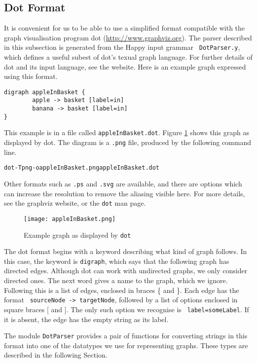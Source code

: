\documentclass[a4paper]{article}
\begin{document}
\subsection{Dot Format}
\label{dotFormat}
It is convenient for us to be able to use a simplified format
compatible with the graph visualisation program dot
(\url{http://www.graphviz.org}).  The parser described in this
subsection is generated from the Happy input grammar {\tt
  DotParser.y}, which defines a useful subest of dot's texual graph
language. For further details of dot and its input language, see the
website.  Here is an example graph expressed using this format.  


\begin{verbatim}
digraph appleInBasket {
        apple -> basket [label=in]
        banana -> basket [label=in]
}
\end{verbatim}
This example is in a file called {\tt appleInBasket.dot}.  Figure
\ref{appleInBasket} shows this graph as displayed by dot.  The diagram
is a {\tt .png} file, produced by the following command line.
\begin{alltt}
dot -Tpng -o appleInBasket.png appleInBasket.dot
\end{alltt}
Other formats such as {\tt .ps} and {\tt .svg} are available, and
there are options which can increase the resolution to remove the
aliasing visible here.  For more details, see the graphviz website, or
the {\tt dot} man page.

\begin{figure}
\begin{center}
\texttt{[image: appleInBasket.png]}
\end{center}
\caption{Example graph as displayed by {\tt dot}}
\label{appleInBasket}
\end{figure}

The dot format begins with a keyword describing what kind of graph
follows.  In this case, the keyword is {\tt digraph}, which says that
the following graph has directed edges.  Although dot can work with
undirected graphs, we only consider directed ones.  The next word
gives a name to the graph, which we ignore.  Following this is a list
of edges, enclosed in braces \{ and \}.  Each edge has the format {\tt
  sourceNode -> targetNode}, followed by a list of options enclosed in
square braces [ and ].  The only such option we recognise is {\tt
  label=someLabel}.  If it is absent, the edge has the empty string as
its label.

The module {\tt DotParser} provides a pair of functions for converting
strings in this format into one of the datatypes we use for
representing graphs.  These types are described in the following
Section.
\end{document}
